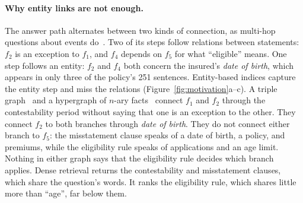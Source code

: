 \documentclass[sigconf, review, anonymous]{acmart}
\begin{document}
\paragraph{Why entity links are not enough.}
The answer path alternates between two kinds of connection, as multi-hop questions about events do~\cite{li2024meqa}. Two of its steps follow relations between statements: $f_2$ is an exception to $f_1$, and $f_4$ depends on $f_5$ for what ``eligible'' means. One step follows an entity: $f_2$ and $f_4$ both concern the insured's \emph{date of birth}, which appears in only three of the policy's 251 sentences. Entity-based indices capture the entity step and miss the relations (Figure~\ref{fig:motivation}a--c). A triple graph~\cite{edge2024local,gutierrez2025rag} and a hypergraph of $n$-ary facts~\cite{luo2025hypergraphrag} connect $f_1$ and $f_2$ through the contestability period without saying that one is an exception to the other. They connect $f_2$ to both branches through \emph{date of birth}. They do not connect either branch to $f_5$: the misstatement clause speaks of a date of birth, a policy, and premiums, while the eligibility rule speaks of applications and an age limit. Nothing in either graph says that the eligibility rule decides which branch applies. Dense retrieval returns the contestability and misstatement clauses, which share the question's words. It ranks the eligibility rule, which shares little more than ``age'', far below them.
\end{document}
